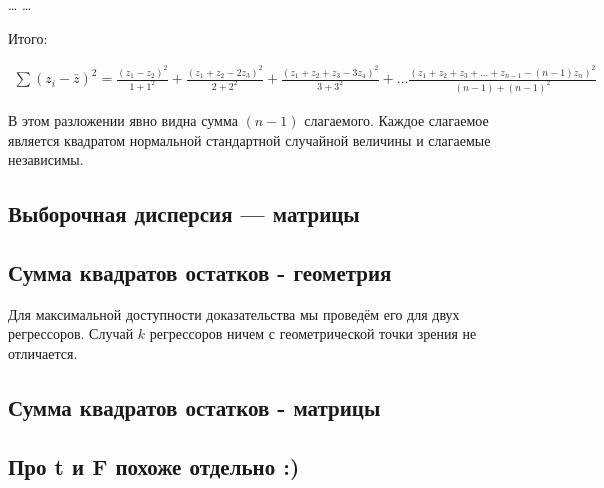 \documentclass[11pt,russian,]{article}
\newcommand{\1}{\mathbbm{1}}
\begin{document}
\ldots{} \ldots{}

Итого:

\begin{multline}
\sum (z_i - \bar z)^2 = \frac{(z_1 - z_2)^2}{1+1^2} + \frac{(z_1 + z_2 - 2z_3)^2}{2+2^2} + \frac{(z_1 + z_2 + z_3 - 3z_4)^2}{3+3^2} + \ldots \frac{(z_1 + z_2 + z_3 + \ldots + z_{n-1} - (n-1)z_n)^2}{(n-1)+(n-1)^2}
\end{multline}

В этом разложении явно видна сумма \((n-1)\) слагаемого. Каждое
слагаемое является квадратом нормальной стандартной случайной величины и
слагаемые независимы.

\subsection{Выборочная дисперсия --- матрицы}\label{--}

\subsection{Сумма квадратов остатков - геометрия}\label{-----}

Для максимальной доступности доказательства мы проведём его для двух
регрессоров. Случай \(k\) регрессоров ничем с геометрической точки
зрения не отличается.

\subsection{Сумма квадратов остатков - матрицы}\label{-----}

\subsection{Про t и F похоже отдельно :)}\label{-t--f--}

\printbibliography
\end{document}
